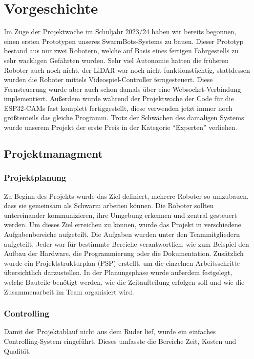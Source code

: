 \chapter{Vorgeschichte}
\label{sec:vorgeschichte}
Im Zuge der Projektwoche im Schuljahr 2023/24 haben wir bereits begonnen,
einen ersten Prototypen unseres SwarmBots-Systems zu bauen.
%
Dieser Prototyp bestand aus nur zwei Robotern,
welche auf Basis eines fertigen Fahrgestells zu sehr wackligen Gefährten wurden.
%
Sehr viel Autonomie hatten die früheren Roboter auch noch nicht,
der LiDAR war noch nicht funktionstüchtig,
stattdessen wurden die Roboter mittels Videospiel-Controller ferngesteuert.
%
Diese Fernsteuerung wurde aber auch schon damals über eine Websocket-Verbindung implementiert.
%
Außerdem wurde während der Projektwoche der Code für die ESP32-CAMs fast komplett fertiggestellt,
diese verwenden jetzt immer noch größtenteils das gleiche Programm.
%
Trotz der Schwächen des damaligen Systems wurde unserem Projekt
der erste Preis in der Kategorie ``Experten'' verliehen.


\section{Projektmanagment}
\label{subsec:projektmanagment}
%
\subsection{Projektplanung}
%

Zu Beginn des Projekts wurde das Ziel definiert, mehrere Roboter so umzubauen, dass sie gemeinsam als Schwarm arbeiten können. Die Roboter sollten untereinander kommunizieren, ihre Umgebung erkennen und zentral gesteuert werden. Um dieses Ziel erreichen zu können, wurde das Projekt in verschiedene Aufgabenbereiche aufgeteilt.
Die Aufgaben wurden unter den Teammitgliedern aufgeteilt. Jeder war für bestimmte Bereiche verantwortlich, wie zum Beispiel den Aufbau der Hardware, die Programmierung oder die Dokumentation.
Zusätzlich wurde ein Projektstrukturplan (PSP) erstellt, um die einzelnen Arbeitsschritte übersichtlich darzustellen.
In der Planungsphase wurde außerdem festgelegt, welche Bauteile benötigt werden, wie die Zeitaufteilung erfolgen soll und wie die Zusammenarbeit im Team organisiert wird.
\subsection{Controlling}
Damit der Projektablauf nicht aus dem Ruder lief, wurde ein einfaches Controlling-System eingeführt. Dieses umfasste die Bereiche Zeit, Kosten und Qualität.
